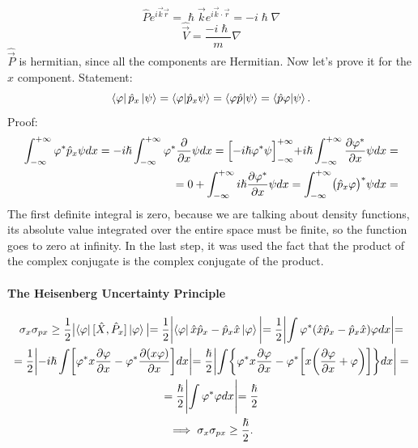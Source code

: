 \documentclass{article}
\begin{document}
$$\hat{P}e^{i\vec{k}\vec{r}}= \hslash \vec{k}e^{i\vec{k}\cdot\vec{r}}  =  -i \hslash \nabla  $$
$$\hat{\vec{V}} = \frac{-i\hslash}{m} \nabla $$
$\hat{\vec{P}}$ is hermitian, since all the components are Hermitian. Now let's prove it for the $x$ component.
Statement:
$$ \bra{\varphi} \hat{p}_x \ket{\psi} = \bra{\varphi} \ket{\hat{p}_x \psi} = \bra{ \varphi \hat{p}} \ket{\psi} = \bra{\hat{p}\varphi}\ket{\psi}.$$
Proof:
\begin{align*}
 \int_{-\infty}^{+\infty} \varphi^* \hat{p}_x \psi dx = -i\hslash \int_{-\infty}^{+\infty} \varphi^* \frac{\partial}{\partial{x}} \psi dx = \Bigl[ -i\hslash\varphi^*\psi \Bigl]_{-\infty}^{+\infty} + i \hslash \int_{-\infty}^{+\infty} \frac{\partial \varphi^*}{\partial x} \psi dx = \\ = 0 + \int_{-\infty}^{+\infty} i \hslash \frac{\partial \varphi^*}{\partial x} \psi dx = \int_{-\infty}^{+\infty} \bigl( \hat{p}_x \varphi \bigl)^* \psi dx =  \end{align*}
The first  definite integral is zero, because we are talking about density functions, its absolute value integrated over the entire space must be finite, so the function goes to zero at infinity. In the last step, it was used the fact that the product of the complex conjugate is the complex conjugate of the product.

\paragraph{The Heisenberg Uncertainty Principle}
\begin{gather*}
    \sigma_x\sigma_{px} \geq \frac{1}{2} \bigl| \bra{\varphi} [ \hat{X}, \hat{P}_x] \ket{\varphi} \bigl| = \frac{1}{2} \biggl| \bra{\varphi} \hat{x}\hat{p}_x - \hat{p}_x \hat{x} \ket{\varphi} \biggl| = \frac{1}{2} \biggl| \int \varphi^* (\hat{x}\hat{p}_x -\hat{p}_x\hat{x}) \varphi dx \biggl| = \\ =  \frac{1}{2} \biggl| -i\hslash \int \biggl[\varphi^* x \frac{\partial \varphi}{\partial x} - \varphi^* \frac{\partial{(x\varphi)}}{\partial x} \biggl] dx \biggl|  = \frac{\hslash}{2} \biggl| \int \biggl\{ \varphi^* x \frac{\partial \varphi}{\partial x} - \varphi^* \biggl[ x \biggl( \frac{\partial \varphi}{\partial x} + \varphi \biggl)\biggr] \biggr\} dx \biggr| = \\ = \frac{\hslash}{2} \Biggl| \int \varphi^* \varphi dx \Biggl|= \frac{\hslash}{2} \\ 
    \implies \sigma_x\sigma_{px} \geq \frac{\hslash}{2}  .
\end{gather*}
\end{document}
